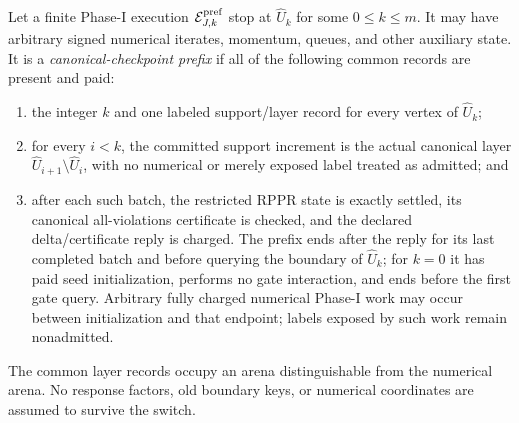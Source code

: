 \begin{definition}
\label{def:branch-caterpillar-canonical-checkpoint-prefix}
Let a finite Phase-I execution $\mathcal E_{J,k}^{\rm pref}$ stop at
$\widehat U_k$ for some $0\leq k\leq m$.  It may have arbitrary signed
numerical iterates, momentum, queues, and other auxiliary state.  It is a
\emph{canonical-checkpoint prefix} if all of the following common records are
present and paid:
\begin{enumerate}
 \item the integer $k$ and one labeled support/layer record for every vertex
       of $\widehat U_k$;
 \item for every $i<k$, the committed support increment is the actual
       canonical layer $\widehat U_{i+1}\setminus\widehat U_i$, with no
       numerical or merely exposed label treated as admitted; and
 \item after each such batch, the restricted RPPR state is exactly settled,
       its canonical all-violations certificate is checked, and the declared
       delta/certificate reply is charged.  The prefix ends after the reply
       for its last completed batch and before querying the boundary of
       $\widehat U_k$; for
       $k=0$ it has paid seed initialization, performs no gate interaction,
       and ends before the first gate query.  Arbitrary fully charged
       numerical Phase-I work may occur between initialization and that
       endpoint; labels exposed by such work remain nonadmitted.
\end{enumerate}
The common layer records occupy an arena distinguishable from the numerical
arena.  No response factors, old boundary keys, or numerical coordinates are
assumed to survive the switch.


\end{definition}
